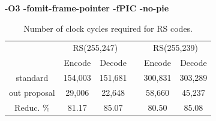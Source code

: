 \begin{center}
\textbf{-O3 -fomit-frame-pointer -fPIC -no-pie}
\end{center}

\begin{table}[b]
    \begin{tabular}{ccclcc}
    \multicolumn{1}{l}{}              & \multicolumn{2}{c}{\cellcolor[HTML]{C0C0C0}RS(255,247)}         &                          & \multicolumn{2}{c}{\cellcolor[HTML]{C0C0C0}RS(255,239)}         \\
    \cellcolor[HTML]{FFFFFF}          & \cellcolor[HTML]{C0C0C0}Encode & \cellcolor[HTML]{C0C0C0}Decode & \cellcolor[HTML]{FFFFFF} & \cellcolor[HTML]{C0C0C0}Encode & \cellcolor[HTML]{C0C0C0}Decode \\ \hline
    \cellcolor[HTML]{EFEFEF}standard   & 154,003                         & 151,681                         &                          & 300,831                         & 303,289                         \\
    \cellcolor[HTML]{EFEFEF}out proposal    & 29,006                          & 22,648                          &                          & 58,660                          & 45,237                          \\
    \cellcolor[HTML]{EFEFEF}Reduc. \% & 81.17                          & 85.07                          &                          & 80.50                          & 85.08                         
    \end{tabular}
    \caption{Number of clock cycles required for RS codes.}
    \label{tab:rs}
\end{table}

